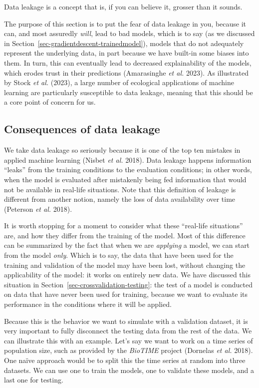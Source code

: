 \documentclass[
  letterpaper,
]{scrbook}
\begin{document}
Data leakage is a concept that is, if you can believe it, grosser than
it sounds.

The purpose of this section is to put the fear of data leakage in you,
because it can, and most assuredly \emph{will}, lead to bad models,
which is to say (as we discussed in
Section~\ref{sec-gradientdescent-trainedmodel}), models that do not
adequately represent the underlying data, in part because we have
built-in some biases into them. In turn, this can eventually lead to
decreased explainability of the models, which erodes trust in their
predictions (Amarasinghe \emph{et al.} 2023). As illustrated by Stock
\emph{et al.} (2023), a large number of ecological applications of
machine learning are particularly susceptible to data leakage, meaning
that this should be a core point of concern for us.

\subsection{Consequences of data
leakage}\label{sec-leakage-consequences}

We take data leakage so seriously because it is one of the top ten
mistakes in applied machine learning (Nisbet \emph{et al.} 2018). Data
leakage happens information ``leaks'' from the training conditions to
the evaluation conditions; in other words, when the model is evaluated
after mistakenly being fed information that would not be available in
real-life situations. Note that this definition of leakage is different
from another notion, namely the loss of data availability over time
(Peterson \emph{et al.} 2018).

It is worth stopping for a moment to consider what these ``real-life
situations'' are, and how they differ from the training of the model.
Most of this difference can be summarized by the fact that when we are
\emph{applying} a model, we can start from the model \emph{only}. Which
is to say, the data that have been used for the training and validation
of the model may have been lost, without changing the applicability of
the model: it works on entirely new data. We have discussed this
situation in Section~\ref{sec-crossvalidation-testing}: the test of a
model is conducted on data that have never been used for training,
because we want to evaluate its performance in the conditions where it
will be applied.

Because this is the behavior we want to simulate with a validation
dataset, it is very important to fully disconnect the testing data from
the rest of the data. We can illustrate this with an example. Let's say
we want to work on a time series of population size, such as provided by
the \emph{BioTIME} project (Dornelas \emph{et al.} 2018). One naïve
approach would be to split this the time series at random into three
datasets. We can use one to train the models, one to validate these
models, and a last one for testing.
\end{document}
